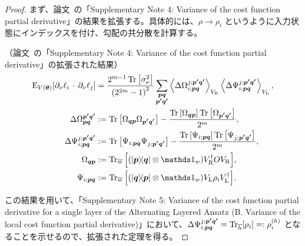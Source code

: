 \begin{proof}
    まず、論文~\cite{cerezo2021cost}の「Supplementary Note 4: Variance of the cost function partial derivative」の結果を拡張する。具体的には、$\rho \rightarrow \rho_i$ というように入力状態にインデックスを付け、勾配の共分散を計算する。
    \begin{screen}
        \begin{theorem}\label{thm:supplementary-4}
            （論文~\cite{cerezo2021cost}の「Supplementary Note 4: Variance of the cost function partial derivative」の拡張された結果）
            \begin{align}
                \E_{V(\bs{\th})}[\pd_\nu\ell_i\,\cdot\,\pd_\nu\ell_j]
                &= \frac{2^{m-1} \Tr\left[\sigma_\nu^2\right]}{\left(2^{2 m}-1\right)^2} 
                \sum_{\substack{\vb*{pq}\\\vb*{p^{\prime} q^{\prime}}}}
                \expval{\Delta \Omega_{i;\vb*{pq}}^{j;\vb*{p^{\prime} q^{\prime}}}}_{V_\rmR}
                \expval{\Delta\Psi_{i;\vb*{pq}}^{j;\vb*{p^{\prime} q^{\prime}}}}_{V_{\rmL}},\\
                \Delta\Omega_{\vb*{pq}}^{\vb*{p^{\prime} q^{\prime}}}
                &:= \Tr\qty[\Omega_{\vb*{qp}} \Omega_{\vb*{p^{\prime} q^{\prime}}}]-\frac{\Tr\qty[\Omega_{\vb*{qp}}] \Tr\qty[\Omega_{\vb*{p^{\prime} q^{\prime}}}]}{2^m}, \nonumber\\
                \Delta \Psi_{i;\vb*{pq}}^{j;\vb*{p^{\prime} q^{\prime}}}
                &:= \Tr\qty[\Psi_{i;\vb*{pq}} \Psi_{j;\vb*{p^{\prime} q^{\prime}}}]-\frac{\Tr\qty[\Psi_{i;\vb*{pq}}] \Tr\qty[\Psi_{j;\vb*{p^{\prime} q^{\prime}}}]}{2^m},\nonumber\\
                \Omega_{\vb*{qp}}
                &:= \Tr_{\bar{w}}\qty[\qty(\ketbra{\vb*{p}}{\vb*{q}} \ot \bbid_w) V_\rmR\dg O V_{\rmR}] ,\nonumber\\
                \Psi_{i;\vb*{pq}}
                &:= \Tr_{\bar{w}}\qty[\qty(\ketbra{\vb*{q}}{\vb*{p}} \ot \bbid_w) V_\rmL \rho_i V_{\rmL}\dg].\nonumber
            \end{align}
        \end{theorem}
    \end{screen}
    
    この結果を用いて、「Supplementary Note 5: Variance of the cost function partial derivative for a single layer of the Alternating Layered Ansatz (B. Variance of the local cost function partial derivative)」において、$\Delta \Psi_{i;\vb*{pq}}^{j;\vb*{p^{\prime} q^{\prime}}} = \Tr_{\overline{h}}[\rho_i] =: \rho_i^{(h)}$ となることを示せるので、拡張された定理を得る。
\end{proof}




